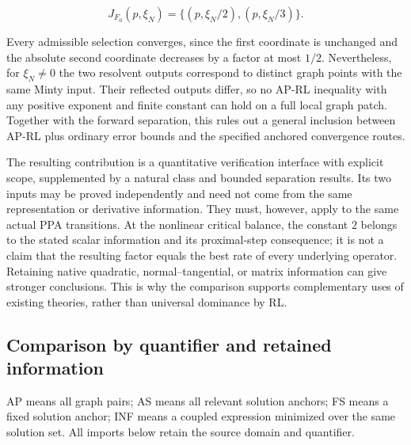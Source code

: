 \documentclass[11pt,a4paper]{article}
\theoremstyle{plain}
\theoremstyle{definition}
\theoremstyle{remark}
\begin{document}
\[
J_{F_0}(p,\xi_N)=\{(p,\xi_N/2),(p,\xi_N/3)\}.
\]

Every admissible selection converges, since the first coordinate is
unchanged and the absolute second coordinate decreases by a factor at
most \(1/2\). Nevertheless, for \(\xi_N\ne0\) the two resolvent outputs
correspond to distinct graph points with the same Minty input. Their
reflected outputs differ, so no AP-RL inequality with any positive
exponent and finite constant can hold on a full local graph patch.
Together with the forward separation, this rules out a general inclusion
between AP-RL plus ordinary error bounds and the specified anchored
convergence routes.

The resulting contribution is a quantitative verification interface with
explicit scope, supplemented by a natural class and bounded separation
results. Its two inputs may be proved independently and need not come
from the same representation or derivative information. They must,
however, apply to the same actual PPA transitions. At the nonlinear
critical balance, the constant \(2\) belongs to the stated scalar
information and its proximal-step consequence; it is not a claim that
the resulting factor equals the best rate of every underlying operator.
Retaining native quadratic, normal--tangential, or matrix information
can give stronger conclusions. This is why the comparison supports
complementary uses of existing theories, rather than universal dominance
by RL.

\hypertarget{comparison-by-quantifier-and-retained-information}{%
\subsection{Comparison by quantifier and retained
information}\label{comparison-by-quantifier-and-retained-information}}

AP means all graph pairs; AS means all relevant solution anchors; FS
means a fixed solution anchor; INF means a coupled expression minimized
over the same solution set. All imports below retain the source domain
and quantifier.
\end{document}
